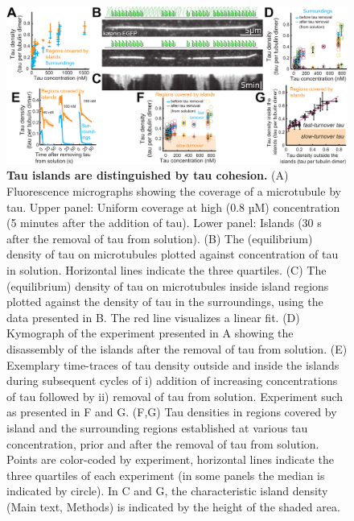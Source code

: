 \begin{figure}[hb!]
\centering
\includegraphics[width=1\linewidth]{Figures/tau_flushouts.png}
\caption[Tau islands are distinguished by tau cohesion.]{
\textbf{Tau islands are distinguished by tau cohesion.} (A) Fluorescence micrographs showing the coverage of a microtubule by tau. Upper panel: Uniform coverage at high (0.8 µM) concentration (5 minutes after the addition of tau). Lower panel: Islands (30 s after the removal of tau from solution). (B) The (equilibrium) density of tau on microtubules plotted against concentration of tau in solution. Horizontal lines indicate the three quartiles. (C) The (equilibrium) density of tau on microtubules inside island regions plotted against the density of tau in the surroundings, using the data presented in B. The red line visualizes a linear fit. (D) Kymograph of the experiment presented in A showing the disassembly of the islands after the removal of tau from solution. (E) Exemplary time-traces of tau density outside and inside the islands during subsequent cycles of i) addition of increasing concentrations of tau followed by ii) removal of tau from solution. Experiment such as presented in F and G. (F,G) Tau densities in regions covered by island and the surrounding regions established at various tau concentration, prior and after the removal of tau from solution. Points are color-coded by experiment, horizontal lines indicate the three quartiles of each experiment (in some panels the median is indicated by circle). In C and G, the characteristic island density (Main text, Methods) is indicated by the height of the shaded area.
	}\label{tauflushouts}
\end{figure}

